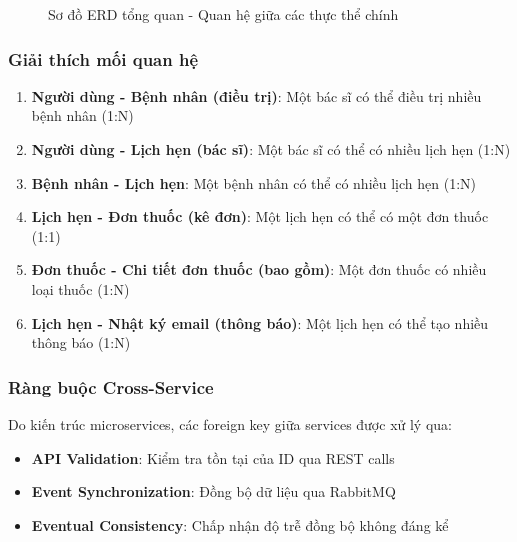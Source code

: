 \documentclass[12pt,a4paper]{report}
\begin{document}
\begin{figure}[h!]
\caption{Sơ đồ ERD tổng quan - Quan hệ giữa các thực thể chính}
\end{figure}

\subsubsection{Giải thích mối quan hệ}
\begin{enumerate}
    \item \textbf{Người dùng - Bệnh nhân (điều trị)}: Một bác sĩ có thể điều trị nhiều bệnh nhân (1:N)
    \item \textbf{Người dùng - Lịch hẹn (bác sĩ)}: Một bác sĩ có thể có nhiều lịch hẹn (1:N)
    \item \textbf{Bệnh nhân - Lịch hẹn}: Một bệnh nhân có thể có nhiều lịch hẹn (1:N)
    \item \textbf{Lịch hẹn - Đơn thuốc (kê đơn)}: Một lịch hẹn có thể có một đơn thuốc (1:1)
    \item \textbf{Đơn thuốc - Chi tiết đơn thuốc (bao gồm)}: Một đơn thuốc có nhiều loại thuốc (1:N)
    \item \textbf{Lịch hẹn - Nhật ký email (thông báo)}: Một lịch hẹn có thể tạo nhiều thông báo (1:N)
\end{enumerate}

\subsubsection{Ràng buộc Cross-Service}
Do kiến trúc microservices, các foreign key giữa services được xử lý qua:
\begin{itemize}
    \item \textbf{API Validation}: Kiểm tra tồn tại của ID qua REST calls
    \item \textbf{Event Synchronization}: Đồng bộ dữ liệu qua RabbitMQ
    \item \textbf{Eventual Consistency}: Chấp nhận độ trễ đồng bộ không đáng kể
\end{itemize}
\end{document}
